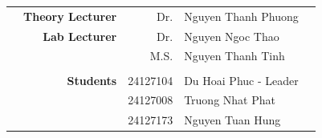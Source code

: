 \begin{titlepage}
\begin{center}
        \begin{table}[H]
            \begin{center}
                \begin{tabular}{rrrlc}
                     & \large{\textbf{Theory Lecturer}} & \large{Dr.} & \large{Nguyen Thanh Phuong}        &                  \\
                     & \large{\textbf{Lab Lecturer}}    & \large{Dr.} &\large{Nguyen Ngoc Thao} &                  \\
                     &                                  & \large{M.S.} & \large{Nguyen Thanh Tinh} &                  \\
                     &                                  &                              &                  \\
                     & \large{\textbf{Students}}        & \large{24127104} & \large{Du Hoai Phuc - Leader}          \\
                     &                                  & \large{24127008} & \large{Truong Nhat Phat}\\
                     &                                  & \large{24127173} & \large{Nguyen Tuan Hung}
                \end{tabular}
            \end{center}
        \end{table}
    \end{center}
	\vspace{3cm}
\end{titlepage}